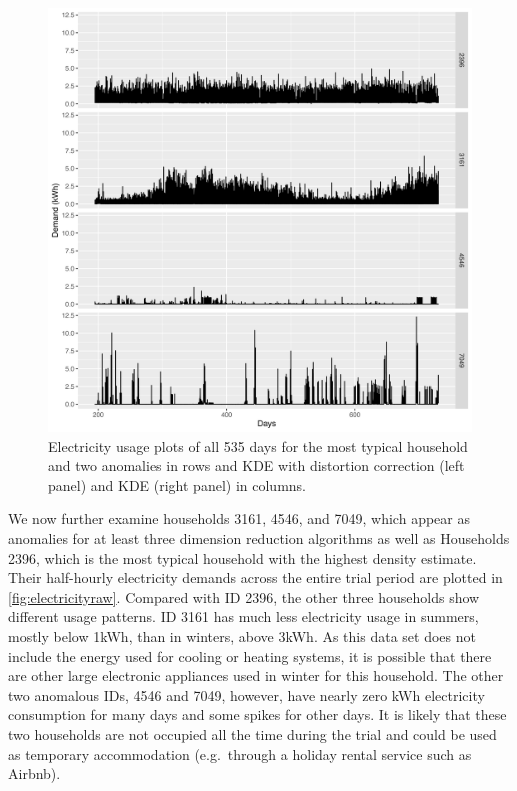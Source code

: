 \documentclass[11pt,a4paper,]{article}
\begin{document}
\begin{figure}

{\centering \includegraphics[width=0.9\linewidth]{figures/Electricity_2d_compare4id_1typical_3anomalous} 

}

\caption{Electricity usage plots of all 535 days for the most typical household and two anomalies in rows and KDE with distortion correction (left panel) and KDE (right panel) in columns.}\label{fig:electricityraw}
\end{figure}

We now further examine households 3161, 4546, and 7049, which appear as anomalies for at least three dimension reduction algorithms as well as Households 2396, which is the most typical household with the highest density estimate. Their half-hourly electricity demands across the entire trial period are plotted in \autoref{fig:electricityraw}. Compared with ID 2396, the other three households show different usage patterns. ID 3161 has much less electricity usage in summers, mostly below 1kWh, than in winters, above 3kWh. As this data set does not include the energy used for cooling or heating systems, it is possible that there are other large electronic appliances used in winter for this household. The other two anomalous IDs, 4546 and 7049, however, have nearly zero kWh electricity consumption for many days and some spikes for other days. It is likely that these two households are not occupied all the time during the trial and could be used as temporary accommodation (e.g.~through a holiday rental service such as Airbnb).
\end{document}
